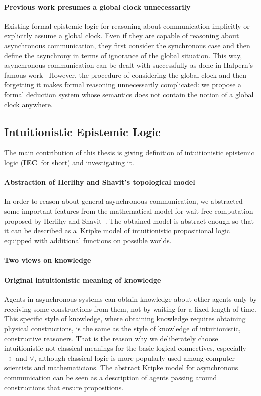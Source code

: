 \documentclass[doctor]{iscs-thesis}
\newcommand{\iec}{{\rm {\textbf{IEC}}}}
\begin{document}
\paragraph{Previous work presumes a global clock unnecessarily}
Existing formal epistemic logic for reasoning about communication implicitly or
explicitly assume a global clock. Even if they are capable of reasoning about
asynchronous communication, they first consider the synchronous case and then define the
asynchrony in terms of ignorance of the global situation.
This way, asynchronous communication can be dealt with successfully as done in Halpern's
famous work~\cite{halpern1985formal,fagin2003reasoning}
However, the procedure of
considering the global clock and then forgetting it
makes formal reasoning unnecessarily complicated:
we propose a formal deduction system whose semantics does not contain the notion of
a global clock anywhere.

\subsection{Intuitionistic Epistemic Logic}

The main contribution of this thesis is giving definition of
intuitionistic epistemic logic (\iec\, for short) and investigating it.

\paragraph{Abstraction of Herlihy and Shavit's topological model}
In order 
to reason about general asynchronous communication,
we abstracted some important features from the mathematical model for wait-free
computation proposed by Herlihy and Shavit~\cite{herlihy1999topological}.
The obtained model is abstract enough so that it can be described as a~Kripke model of
intuitionistic propositional logic equipped with additional functions on possible worlds.

\paragraph{Two views on knowledge}

\paragraph{Original intuitionistic meaning of knowledge}
 Agents in asynchronous systems can
 obtain knowledge about other agents only by receiving some constructions from them,
 not by waiting for a fixed length of time.
 This specific style of knowledge, where
 obtaining knowledge requires obtaining physical constructions,
 is the same as the style of knowledge of intuitionistic, constructive reasoners.
 That is the reason why we deliberately choose intuitionistic not classical meanings for
 the basic logical connectives, especially $\supset$ and $\vee$, although classical logic
 is more popularly used among computer scientists and mathematicians.
 The abstract Kripke model for asynchronous communication
 can be seen as a description of agents passing around constructions that ensure
 propositions.
\end{document}
